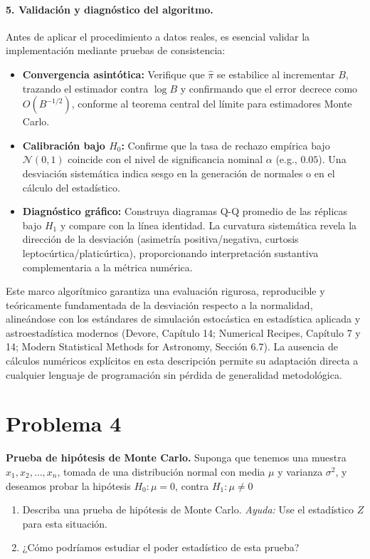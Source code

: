 \documentclass[12pt]{article}
\begin{document}
\paragraph{5. Validación y diagnóstico del algoritmo.}
Antes de aplicar el procedimiento a datos reales, es esencial validar la implementación mediante pruebas de consistencia:
\begin{itemize}
    \item \textbf{Convergencia asintótica:} Verifique que $\hat{\pi}$ se estabilice al incrementar $B$, trazando el estimador contra $\log B$ y confirmando que el error decrece como $O(B^{-1/2})$, conforme al teorema central del límite para estimadores Monte Carlo.
    \item \textbf{Calibración bajo $H_0$:} Confirme que la tasa de rechazo empírica bajo $\mathcal{N}(0,1)$ coincide con el nivel de significancia nominal $\alpha$ (e.g., $0.05$). Una desviación sistemática indica sesgo en la generación de normales o en el cálculo del estadístico.
    \item \textbf{Diagnóstico gráfico:} Construya diagramas Q-Q promedio de las réplicas bajo $H_1$ y compare con la línea identidad. La curvatura sistemática revela la dirección de la desviación (asimetría positiva/negativa, curtosis leptocúrtica/platicúrtica), proporcionando interpretación sustantiva complementaria a la métrica numérica.
\end{itemize}
Este marco algorítmico garantiza una evaluación rigurosa, reproducible y teóricamente fundamentada de la desviación respecto a la normalidad, alineándose con los estándares de simulación estocástica en estadística aplicada y astroestadística modernos (Devore, Capítulo 14; Numerical Recipes, Capítulo 7 y 14; Modern Statistical Methods for Astronomy, Sección 6.7). La ausencia de cálculos numéricos explícitos en esta descripción permite su adaptación directa a cualquier lenguaje de programación sin pérdida de generalidad metodológica.

\section{Problema 4}
\textbf{Prueba de hipótesis de Monte Carlo.} Suponga que tenemos una muestra $x_1, x_2, \dots, x_n$, tomada de una distribución normal con media $\mu$ y varianza $\sigma^2$, y deseamos probar la hipótesis $H_0 : \mu = 0$, contra $H_1 : \mu \neq 0$
\begin{enumerate}
\item Describa una prueba de hipótesis de Monte Carlo. \textit{Ayuda:} Use el estadístico $Z$ para esta situación.
\item ¿Cómo podríamos estudiar el poder estadístico de esta prueba?
\end{enumerate}
\end{document}
